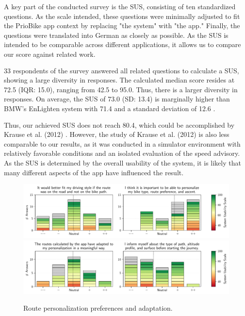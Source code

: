 A key part of the conducted survey is the SUS, consisting of ten standardized questions. As the scale intended, these questions were minimally adjusted to fit the PrioBike app context by replacing "the system" with "the app." Finally, the questions were translated into German as closely as possible. As the SUS is intended to be comparable across different applications, it allows us to compare our score against related work. 

33 respondents of the survey answered all related questions to calculate a SUS, showing a large diversity in responses. The calculated median score resides at 72.5 (IQR: 15.0), ranging from 42.5 to 95.0. Thus, there is a larger diversity in responses. On average, the SUS of 73.0 (SD: 13.4) is marginally higher than BMW's EnLighten system with 71.4 and a standard deviation of 12.6 \cite{wilson_driver_2017}. 

Thus, our achieved SUS does not reach 80.4, which could be accomplished by Krause et al. (2012) \cite{krause_traffic_2012}. However, the study of Krause et al. (2012) \cite{krause_traffic_2012} is also less comparable to our results, as it was conducted in a simulator environment with relatively favorable conditions and an isolated evaluation of the speed advisory. As the SUS is determined by the overall usability of the system, it is likely that many different aspects of the app have influenced the result.

\begin{figure}[t]
\caption{Route personalization preferences and adaptation.}\label{fig:route-personalization}
\includegraphics[width=\linewidth]{images/app-usability-questions-route-personalization.pdf}
\\
\includegraphics[width=\linewidth]{images/app-usability-questions-route-personalization-adaptation.pdf}
\end{figure}

